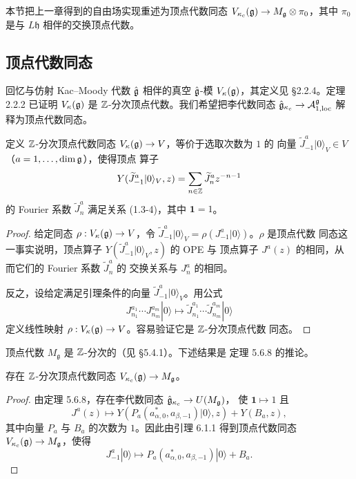 本节把上一章得到的自由场实现重述为顶点代数同态
$V_{\kappa_c}(\mathfrak{g})\to M_{\mathfrak g}\otimes\pi_0$，其中 $\pi_0$ 是与
$L\mathfrak h$ 相伴的交换顶点代数。

\subsection{顶点代数同态}

回忆与仿射 Kac--Moody 代数 $\hat{\mathfrak{g}}$ 相伴的真空 $\hat{\mathfrak{g}}$-模
$V_\kappa(\mathfrak{g})$，其定义见 \S2.2.4。定理 2.2.2 已证明 $V_\kappa(\mathfrak{g})$ 是
$\mathbb{Z}$-分次顶点代数。我们希望把李代数同态
$\hat{\mathfrak{g}}_{\kappa_c}\to\mathcal{A}^{\mathfrak g}_{1,\mathrm{loc}}$ 解释为顶点代数同态。

\renewcommand{\thelemma}{6.1.1}
\begin{lemma}
    定义 $\mathbb{Z}$-分次顶点代数同态 $V_\kappa(\mathfrak{g})\to V$，等价于选取次数为 $1$ 的
    向量 $\widetilde J^a_{-1}|0\rangle_V\in V$（$a=1,\dots,\dim\mathfrak{g}$），使得顶点
    算子
    \[
        Y(\widetilde J^a_{-1}|0\rangle_V,z)
        =\sum_{n\in\mathbb{Z}}\widetilde J^a_nz^{-n-1}
    \]
    的 Fourier 系数 $\widetilde J^a_n$ 满足关系 (1.3-4)，其中 $\mathbf 1=1$。
\end{lemma}

\begin{proof}
    给定同态 $\rho:V_\kappa(\mathfrak{g})\to V$，令
    $\widetilde J^a_{-1}|0\rangle_V=\rho(J^a_{-1}|0\rangle)$。$\rho$ 是顶点代数
    同态这一事实说明，顶点算子 $Y(\widetilde J^a_{-1}|0\rangle_V,z)$ 的 OPE 与
    顶点算子 $J^a(z)$ 的相同，从而它们的 Fourier 系数 $\widetilde J^a_n$ 的
    交换关系与 $J^a_n$ 的相同。

    反之，设给定满足引理条件的向量 $\widetilde J^a_{-1}|0\rangle_V$。用公式
    \[
        J^{a_1}_{n_1}\cdots J^{a_m}_{n_m}|0\rangle
        \mapsto\widetilde J^{a_1}_{n_1}\cdots\widetilde J^{a_m}_{n_m}|0\rangle
    \]
    定义线性映射 $\rho:V_\kappa(\mathfrak{g})\to V$。容易验证它是 $\mathbb{Z}$-分次顶点代数
    同态。
\end{proof}

顶点代数 $M_{\mathfrak g}$ 是 $\mathbb{Z}$-分次的（见 \S5.4.1）。下述结果是
定理 5.6.8 的推论。

\renewcommand{\thecorollary}{6.1.2}
\begin{corollary}
    存在 $\mathbb{Z}$-分次顶点代数同态 $V_{\kappa_c}(\mathfrak{g})\to M_{\mathfrak g}$。
\end{corollary}

\begin{proof}
    由定理 5.6.8，存在李代数同态 $\hat{\mathfrak{g}}_{\kappa_c}\to U(M_{\mathfrak g})$，
    使 $\mathbf 1\mapsto1$ 且
    \[
        J^a(z)\mapsto Y(P_a(a^*_{\alpha,0},a_{\beta,-1})|0\rangle,z)+Y(B_a,z),
    \]
    其中向量 $P_a$ 与 $B_a$ 的次数为 $1$。因此由引理 6.1.1 得到顶点代数同态
    $V_{\kappa_c}(\mathfrak{g})\to M_{\mathfrak g}$，使得
    \[
        J^a_{-1}|0\rangle\mapsto
        P_a(a^*_{\alpha,0},a_{\beta,-1})|0\rangle+B_a.
    \]
\end{proof}

